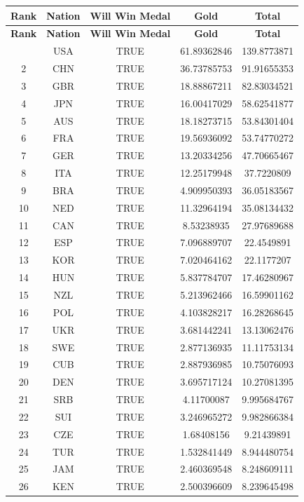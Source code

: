 \documentclass[12pt]{article}
\begin{document}
\begin{longtable}{|c|c|c|c|c|}
\hline
\textbf{Rank} & \textbf{Nation} & \textbf{Will Win Medal} & \textbf{Gold} & \textbf{Total} \\
\hline
\endfirsthead
\hline
\textbf{Rank} & \textbf{Nation} & \textbf{Will Win Medal} & \textbf{Gold} & \textbf{Total} \\
\hline
\endhead
\hline
\endfoot
1 & USA & TRUE & 61.89362846 & 139.8773871 \\
2 & CHN & TRUE & 36.73785753 & 91.91655353 \\
3 & GBR & TRUE & 18.88867211 & 82.83034521 \\
4 & JPN & TRUE & 16.00417029 & 58.62541877 \\
5 & AUS & TRUE & 18.18273715 & 53.84301404 \\
6 & FRA & TRUE & 19.56936092 & 53.74770272 \\
7 & GER & TRUE & 13.20334256 & 47.70665467 \\
8 & ITA & TRUE & 12.25179948 & 37.7220809 \\
9 & BRA & TRUE & 4.909950393 & 36.05183567 \\
10 & NED & TRUE & 11.32964194 & 35.08134432 \\
11 & CAN & TRUE & 8.53238935 & 27.97689688 \\
12 & ESP & TRUE & 7.096889707 & 22.4549891 \\
13 & KOR & TRUE & 7.020464162 & 22.1177207 \\
14 & HUN & TRUE & 5.837784707 & 17.46280967 \\
15 & NZL & TRUE & 5.213962466 & 16.59901162 \\
16 & POL & TRUE & 4.103828217 & 16.28268645 \\
17 & UKR & TRUE & 3.681442241 & 13.13062476 \\
18 & SWE & TRUE & 2.877136935 & 11.11753134 \\
19 & CUB & TRUE & 2.887936985 & 10.75076093 \\
20 & DEN & TRUE & 3.695717124 & 10.27081395 \\
21 & SRB & TRUE & 4.11700087 & 9.995684767 \\
22 & SUI & TRUE & 3.246965272 & 9.982866384 \\
23 & CZE & TRUE & 1.68408156 & 9.21439891 \\
24 & TUR & TRUE & 1.532841449 & 8.944480754 \\
25 & JAM & TRUE & 2.460369548 & 8.248609111 \\
26 & KEN & TRUE & 2.500396609 & 8.239645498 \\

\end{longtable}
\end{document}
